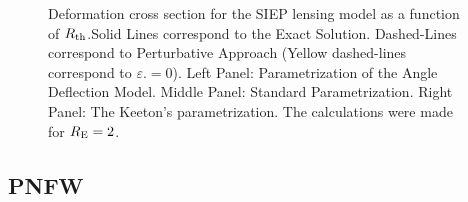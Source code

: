 \begin{figure}[!ht]
{}
\caption{\label{dcs_siep_rth_pm} Deformation cross section for the  SIEP lensing
model as a function of $R_{\rm th}$.Solid Lines correspond to the Exact
Solution. Dashed-Lines correspond to Perturbative Approach (Yellow dashed-lines 
correspond to $\varepsilon.=0$). Left Panel:
Parametrization of the Angle Deflection Model. Middle Panel: Standard
Parametrization. Right Panel: The Keeton's parametrization. The calculations
were
made for $R_{\rm E}=2$.}
\end{figure}




\subsection{PNFW}


